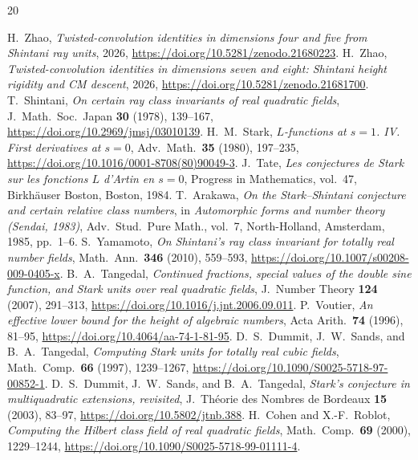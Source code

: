 \documentclass[11pt]{article}
\begin{document}
\begin{thebibliography}{20}
\raggedright
{}
H.~Zhao, \emph{Twisted-convolution identities in dimensions four and
five from Shintani ray units}, 2026,
\url{https://doi.org/10.5281/zenodo.21680223}.
H.~Zhao, \emph{Twisted-convolution identities in dimensions seven and
eight: Shintani height rigidity and CM descent}, 2026,
\url{https://doi.org/10.5281/zenodo.21681700}.
T.~Shintani, \emph{On certain ray class invariants of real quadratic
fields}, J.\ Math.\ Soc.\ Japan \textbf{30} (1978), 139--167,
\url{https://doi.org/10.2969/jmsj/03010139}.
H.~M.~Stark, \emph{\(L\)-functions at \(s=1\). IV. First derivatives
at \(s=0\)}, Adv.\ Math.\ \textbf{35} (1980), 197--235,
\url{https://doi.org/10.1016/0001-8708(80)90049-3}.
J.~Tate, \emph{Les conjectures de Stark sur les fonctions \(L\)
d'Artin en \(s=0\)}, Progress in Mathematics, vol.~47,
Birkh\"auser Boston, Boston, 1984.
T.~Arakawa, \emph{On the Stark--Shintani conjecture and certain
relative class numbers}, in \emph{Automorphic forms and number
theory (Sendai, 1983)}, Adv.\ Stud.\ Pure Math., vol.~7,
North-Holland, Amsterdam, 1985, pp.~1--6.
S.~Yamamoto, \emph{On Shintani's ray class invariant for totally real
number fields}, Math.\ Ann.\ \textbf{346} (2010), 559--593,
\url{https://doi.org/10.1007/s00208-009-0405-x}.
B.~A.~Tangedal, \emph{Continued fractions, special values of the
double sine function, and Stark units over real quadratic fields},
J.\ Number Theory \textbf{124} (2007), 291--313,
\url{https://doi.org/10.1016/j.jnt.2006.09.011}.
P.~Voutier, \emph{An effective lower bound for the height of algebraic
numbers}, Acta Arith.\ \textbf{74} (1996), 81--95,
\url{https://doi.org/10.4064/aa-74-1-81-95}.
D.~S.~Dummit, J.~W.~Sands, and B.~A.~Tangedal,
\emph{Computing Stark units for totally real cubic fields},
Math.\ Comp.\ \textbf{66} (1997), 1239--1267,
\url{https://doi.org/10.1090/S0025-5718-97-00852-1}.
D.~S.~Dummit, J.~W.~Sands, and B.~A.~Tangedal,
\emph{Stark's conjecture in multiquadratic extensions, revisited},
J.\ Th\'eorie des Nombres de Bordeaux \textbf{15} (2003), 83--97,
\url{https://doi.org/10.5802/jtnb.388}.
H.~Cohen and X.-F.~Roblot, \emph{Computing the Hilbert class field of
real quadratic fields}, Math.\ Comp.\ \textbf{69} (2000), 1229--1244,
\url{https://doi.org/10.1090/S0025-5718-99-01111-4}.

\end{thebibliography}
\end{document}
